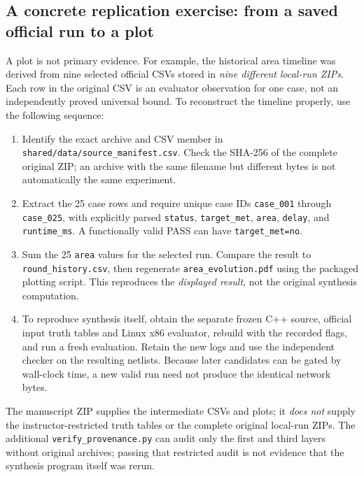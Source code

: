 \documentclass[a4paper,10pt]{article}
\theoremstyle{definition}
\theoremstyle{remark}
\begin{document}
\subsection{A concrete replication exercise: from a saved official run to a plot}
A plot is not primary evidence. For example, the historical area timeline was derived from nine selected official CSVs stored in \emph{nine different local-run ZIPs}. Each row in the original CSV is an evaluator observation for one case, not an independently proved universal bound. To reconstruct the timeline properly, use the following sequence:
\begin{enumerate}[leftmargin=2em]
\item Identify the exact archive and CSV member in \texttt{shared/data/source\_manifest.csv}. Check the SHA-256 of the complete original ZIP; an archive with the same filename but different bytes is not automatically the same experiment.
\item Extract the 25 case rows and require unique case IDs \texttt{case\_001} through \texttt{case\_025}, with explicitly parsed \texttt{status}, \texttt{target\_met}, \texttt{area}, \texttt{delay}, and \texttt{runtime\_ms}. A functionally valid PASS can have \texttt{target\_met=no}.
\item Sum the 25 \texttt{area} values for the selected run. Compare the result to \texttt{round\_history.csv}, then regenerate \texttt{area\_evolution.pdf} using the packaged plotting script. This reproduces the \emph{displayed result}, not the original synthesis computation.
\item To reproduce synthesis itself, obtain the separate frozen C++ source, official input truth tables and Linux x86 evaluator, rebuild with the recorded flags, and run a fresh evaluation. Retain the new logs and use the independent checker on the resulting netlists. Because later candidates can be gated by wall-clock time, a new valid run need not produce the identical network bytes.
\end{enumerate}
The manuscript ZIP supplies the intermediate CSVs and plots; it \emph{does not} supply the instructor-restricted truth tables or the complete original local-run ZIPs. The additional \texttt{verify\_provenance.py} can audit only the first and third layers without original archives; passing that restricted audit is not evidence that the synthesis program itself was rerun.
\end{document}
